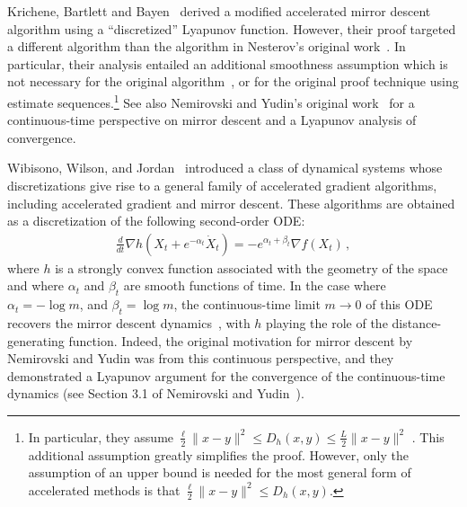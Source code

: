 \documentclass[11pt]{article}
\theoremstyle{plain}
\begin{document}
Krichene, Bartlett and Bayen~\cite{Krichene15} derived a modified accelerated mirror descent algorithm using a ``discretized'' Lyapunov function. However, their proof targeted a different algorithm than the algorithm in Nesterov's original work~\cite{Nesterov05}. In particular, their analysis entailed an additional smoothness assumption which is not necessary for the original algorithm~\cite{Nesterov05}, or for the original proof technique using estimate sequences.\footnote{In particular, they assume $\frac{\ell }{2} \|x-y\|^2 \leq  D_h(x,y) \leq \frac{L}{2}\|x-y\|^2$%
. This additional assumption greatly simplifies the proof. However, only the assumption of an upper bound is needed for the most general form of accelerated methods is that $\frac{\ell }{2} \|x-y\|^2 \leq  D_h(x,y)$.} See also Nemirovski and Yudin's original work~\cite{NemirovskiiYudin} for a continuous-time perspective on mirror descent and a Lyapunov analysis of convergence.

Wibisono, Wilson, and Jordan~\cite{Acceleration} introduced a class of dynamical systems whose discretizations give rise to a general family of accelerated gradient algorithms, including accelerated gradient and mirror descent. These algorithms are obtained as a discretization of the following second-order ODE:
 \begin{align} \label{Eq:ELBreg} 
\frac{d}{dt} \nabla h(X_t + e^{-\alpha_t} \dot X_t) = -e^{\alpha_t+\beta_t} \nabla f(X_t)\,,
\end{align}
where $h$ is a strongly convex function associated with the geometry of the space and where $\alpha_t$ and $\beta_t$ are smooth functions of time.  In the case where $\alpha_t=-\log m$, and $\beta_t = \log m$,  the continuous-time limit $m \rightarrow 0$ of this ODE recovers the mirror descent dynamics~\cite{Acceleration}, with $h$ playing the role of the distance-generating function.  Indeed, the original motivation for mirror descent by Nemirovski and Yudin was from this continuous perspective, and they demonstrated a Lyapunov argument for the convergence of the continuous-time dynamics (see Section 3.1 of Nemirovski and Yudin~\cite{NemirovskiiYudin}).
\end{document}
